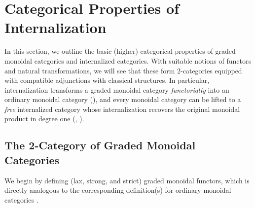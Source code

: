 \documentclass[openany, amssymb, psamsfonts]{amsart}
\theoremstyle{definition}
\numberwithin{equation}{section}
\begin{document}
\section{Categorical Properties of Internalization}
\label{section:categorical_properties}

In this section, we outline the basic (higher) categorical properties of graded monoidal categories and internalized categories. With suitable notions of functors and natural transformations, we will see that these form 2-categories equipped with compatible adjunctions with classical structures. In particular, internalization transforms a graded monoidal category \emph{functorially} into an ordinary monoidal category (), and every monoidal category can be lifted to a \emph{free} internalized category whose internalization recovers the original monoidal product in degree one (, ).

\subsection{The 2-Category of Graded Monoidal Categories}

We begin by defining (lax, strong, and strict) graded monoidal functors, which is directly analogous to the corresponding definition(s) for ordinary monoidal categories \cite[Chapter~XI]{maclane}.
\end{document}
